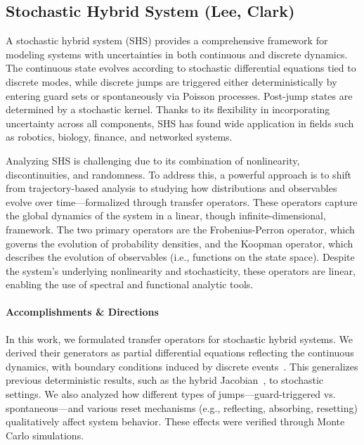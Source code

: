 \documentclass[letterpaper,11pt]{article}
\begin{document}
\subsection{Stochastic Hybrid System (Lee, Clark)}\label{sec:SHS}

A stochastic hybrid system (SHS) provides a comprehensive framework for modeling systems with uncertainties in both continuous and discrete dynamics.
The continuous state evolves according to stochastic differential equations tied to discrete modes, while discrete jumps are triggered either deterministically by entering guard sets or spontaneously via Poisson processes.
Post-jump states are determined by a stochastic kernel.
Thanks to its flexibility in incorporating uncertainty across all components, SHS has found wide application in fields such as robotics, biology, finance, and networked systems.

Analyzing SHS is challenging due to its combination of nonlinearity, discontinuities, and randomness.
To address this, a powerful approach is to shift from trajectory-based analysis to studying how distributions and observables evolve over time—formalized through transfer operators.
These operators capture the global dynamics of the system in a linear, though infinite-dimensional, framework.
The two primary operators are the Frobenius-Perron operator, which governs the evolution of probability densities, and the Koopman operator, which describes the evolution of observables (i.e., functions on the state space).
Despite the system’s underlying nonlinearity and stochasticity, these operators are linear, enabling the use of spectral and functional analytic tools.

\paragraph{Accomplishments \& Directions}

In this work, we formulated transfer operators for stochastic hybrid systems.
We derived their generators as partial differential equations reflecting the continuous dynamics, with boundary conditions induced by discrete events~\cite{stochastic-hybrid}.
This generalizes previous deterministic results, such as the hybrid Jacobian~\cite{OpSh_fp}, to stochastic settings.
We also analyzed how different types of jumps—guard-triggered vs. spontaneous—and various reset mechanisms (e.g., reflecting, absorbing, resetting) qualitatively affect system behavior.
These effects were verified through Monte Carlo simulations.
\end{document}
